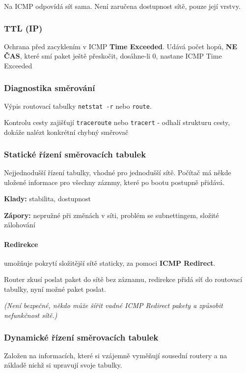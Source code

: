 \documentclass[10pt,a4paper]{article}
\begin{document}
Na ICMP odpovídá síť sama. Není zaručena dostupnost sítě, pouze její vrstvy.

\subsubsection{TTL (IP)}

Ochrana před zacyklením v ICMP \textbf{Time Exceeded}. Udává počet hopů, \textbf{NE ČAS}, které smí paket ještě přeskočit, dosáhne-li 0, nastane ICMP Time Exceeded


\subsubsection{Diagnostika směrování}

Výpis routovací tabulky \texttt{netstat -r} nebo \texttt{route}.

Kontrolu cesty zajišťují \texttt{traceroute} nebo \texttt{tracert} - odhalí strukturu cesty, dokáže nalézt konkrétní chybný směrovač


\subsubsection{Statické řízení směrovacích tabulek}

Nejjednodušší řízení tabulky, vhodné pro jednodušší sítě. Počítač má někde uložené informace pro všechny záznmy, které po bootu postupně přidává.

\textbf{Klady:} stabilita, dostupnost

\textbf{Zápory:} nepružné při změnách v síti, problém se subnettingem, složité zálohování

\paragraph*{Redirekce} umožňuje pokrytí složitější sítě staticky, za pomoci \textbf{ICMP Redirect}.

Router zkusí poslat paket do sítě bez záznamu, redirekce přidá síť do routovací tabulky, nyní možné paket poslat.

\textit{(Není bezpečné, někdo může šířit vadné ICMP Redirect pakety a způsobit nefunkčnost sítě.)}

\subsubsection{Dynamické řízení směrovacích tabulek}

Založen na informacích, které si vzájemně vyměňují sousední routery a na základě nichž si upravují svoje tabulky.
\end{document}
